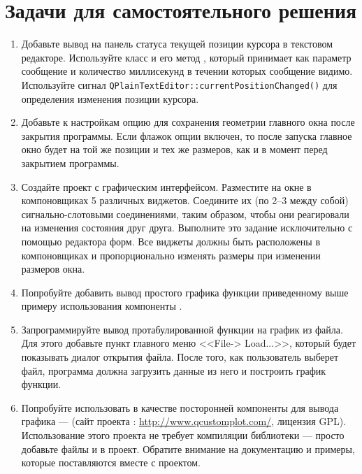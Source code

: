 \section[Задачи для самостоятельного решения]{Задачи для самостоятельного решения}
\begin{enumerate}
\item Добавьте вывод на панель статуса текущей позиции курсора в текстовом редакторе. Используйте класс  и его
метод , который принимает как параметр сообщение и количество миллисекунд в течении которых сообщение
видимо. Используйте сигнал \lstinline!QPlainTextEditor::currentPositionChanged()! для определения изменения позиции курсора.
\item Добавьте к настройкам опцию для сохранения геометрии главного окна после закрытия программы. Если флажок опции
включен, то после запуска главное окно будет на той же позиции и тех же размеров, как и в момент перед закрытием
программы. 
\item Создайте проект с графическим интерфейсом. Разместите на окне в компоновщиках 5 различных виджетов. Соедините их
(по 2--3 между собой) сигнально-слотовыми соединениями, таким образом, чтобы они реагировали на изменения состояния друг
друга. Выполните это задание исключительно с помощью редактора форм. Все виджеты должны быть расположены в
компоновщиках и пропорционально изменять размеры при изменении размеров окна.
\item Попробуйте добавить вывод простого графика функции приведенному выше примеру использования компоненты .
\item Запрограммируйте вывод протабулированной функции на график из файла. Для этого добавьте пункт главного меню
<<File-> Load...>>, который будет показывать диалог открытия файла. После того, как
пользователь выберет файл, программа должна загрузить данные из него и построить график функции.
\item Попробуйте использовать в качестве посторонней компоненты для вывода графика  ---  (сайт проекта :
\url{http://www.qcustomplot.com/}, лицензия GPL). Использование этого проекта не требует компиляции библиотеки --- просто
добавьте файлы  и   в проект. Обратите внимание на документацию и примеры, которые
поставляются вместе с проектом.
\end{enumerate}
